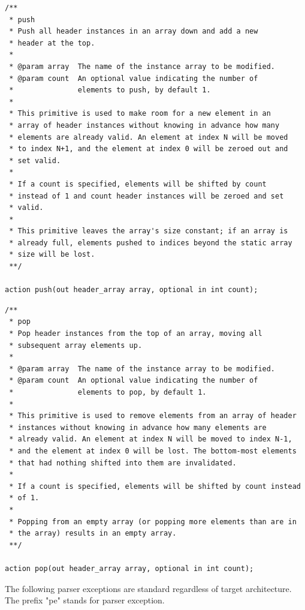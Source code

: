 \documentclass[12pt]{article}
\begin{document}
\begin{lstlisting}[style=P4style]
/**
 * push
 * Push all header instances in an array down and add a new
 * header at the top.
 * 
 * @param array  The name of the instance array to be modified.
 * @param count  An optional value indicating the number of
 *               elements to push, by default 1.
 * 
 * This primitive is used to make room for a new element in an
 * array of header instances without knowing in advance how many
 * elements are already valid. An element at index N will be moved
 * to index N+1, and the element at index 0 will be zeroed out and
 * set valid.
 * 
 * If a count is specified, elements will be shifted by count
 * instead of 1 and count header instances will be zeroed and set
 * valid.
 * 
 * This primitive leaves the array's size constant; if an array is
 * already full, elements pushed to indices beyond the static array
 * size will be lost.
 **/

action push(out header_array array, optional in int count);

\end{lstlisting}


\begin{lstlisting}[style=P4style]
/**
 * pop
 * Pop header instances from the top of an array, moving all
 * subsequent array elements up.
 * 
 * @param array  The name of the instance array to be modified.
 * @param count  An optional value indicating the number of
 *               elements to pop, by default 1.
 *  
 * This primitive is used to remove elements from an array of header
 * instances without knowing in advance how many elements are
 * already valid. An element at index N will be moved to index N-1,
 * and the element at index 0 will be lost. The bottom-most elements
 * that had nothing shifted into them are invalidated.
 * 
 * If a count is specified, elements will be shifted by count instead
 * of 1.
 * 
 * Popping from an empty array (or popping more elements than are in
 * the array) results in an empty array.
 **/

action pop(out header_array array, optional in int count);

\end{lstlisting}



The following parser exceptions are standard regardless of target architecture.
The prefix "pe" stands for parser exception.
\end{document}
